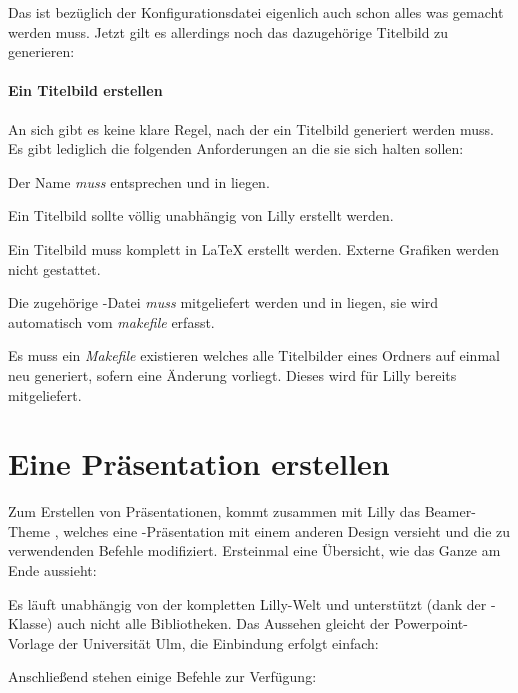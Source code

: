 Das ist bezüglich der Konfigurationsdatei eigenlich auch schon alles was gemacht werden muss. Jetzt gilt es allerdings noch das dazugehörige Titelbild zu generieren:

\paragraph{Ein Titelbild erstellen}
An sich gibt es keine klare Regel, nach der ein Titelbild generiert werden muss. Es gibt lediglich die folgenden Anforderungen an die sie sich halten sollen:
\begin{ditemize}
    \item Der Name \emph{muss}  entsprechen und in  liegen.
    \item Ein Titelbild sollte völlig unabhängig von Lilly erstellt werden.
    \item Ein Titelbild muss komplett in \LaTeX{} erstellt werden. Externe Grafiken werden nicht gestattet.
    \item Die zugehörige -Datei \emph{muss} mitgeliefert werden und in  liegen, sie wird automatisch vom \emph{makefile} erfasst.
    \item Es muss ein \emph{Makefile} existieren welches alle Titelbilder eines Ordners auf einmal neu generiert, sofern eine Änderung vorliegt. Dieses wird für Lilly bereits mitgeliefert.
\end{ditemize}

\section{Eine Präsentation erstellen}
Zum Erstellen von Präsentationen, kommt zusammen mit Lilly das Beamer-Theme , welches eine -Präsentation mit einem anderen Design versieht und die zu verwendenden Befehle modifiziert. Ersteinmal eine Übersicht, wie das Ganze am Ende aussieht:
\begin{tcbraster}[raster columns=3, blankest,colback=white]
\end{tcbraster}
Es läuft unabhängig von der kompletten Lilly-Welt und unterstützt (dank der -Klasse) auch nicht alle Bibliotheken. Das Aussehen gleicht der Powerpoint-Vorlage der Universität Ulm, die Einbindung erfolgt einfach:
Anschließend stehen einige Befehle zur Verfügung:

